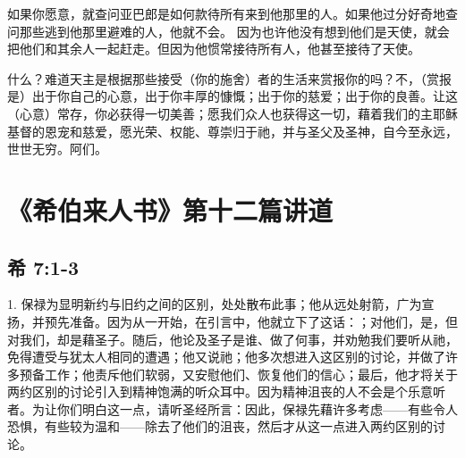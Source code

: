 如果你愿意，就查问亚巴郎是如何款待所有来到他那里的人。如果他过分好奇地查问那些逃到他那里避难的人，他就不会。  因为也许他没有想到他们是天使，就会把他们和其余人一起赶走。但因为他惯常接待所有人，他甚至接待了天使。\par

什么？难道天主是根据那些接受（你的施舍）者的生活来赏报你的吗？不，（赏报是）出于你自己的心意，出于你丰厚的慷慨；出于你的慈爱；出于你的良善。让这（心意）常存，你必获得一切美善；愿我们众人也获得这一切，藉着我们的主耶稣基督的恩宠和慈爱，愿光荣、权能、尊崇归于祂，并与圣父及圣神，自今至永远，世世无穷。阿们。\par



\section{《希伯来人书》第十二篇讲道}


\subsection{希 7:1-3}

\par

1. 保禄为显明新约与旧约之间的区别，处处散布此事；他从远处射箭，广为宣扬，并预先准备。因为从一开始，在引言中，他就立下了这话：；对他们，是，但对我们，却是藉圣子。随后，他论及圣子是谁、做了何事，并劝勉我们要听从祂，免得遭受与犹太人相同的遭遇；他又说祂；他多次想进入这区别的讨论，并做了许多预备工作；他责斥他们软弱，又安慰他们、恢复他们的信心；最后，他才将关于两约区别的讨论引入到精神饱满的听众耳中。因为精神沮丧的人不会是个乐意听者。为让你们明白这一点，请听圣经所言：因此，保禄先藉许多考虑——有些令人恐惧，有些较为温和——除去了他们的沮丧，然后才从这一点进入两约区别的讨论。\par

